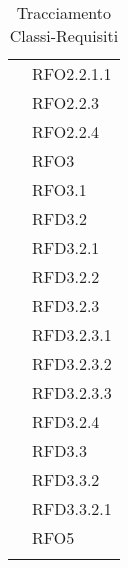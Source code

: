 \begin{longtable}{|>{\centering}m{10cm}|m{3cm}<{\centering}|}
& RFO2.2.1.1\\
& RFO2.2.3\\
& RFO2.2.4\\
& RFO3\\
& RFO3.1\\
& RFD3.2\\
& RFD3.2.1\\
& RFD3.2.2\\
& RFD3.2.3\\
& RFD3.2.3.1\\
& RFD3.2.3.2\\
& RFD3.2.3.3\\
& RFD3.2.4\\
& RFD3.3\\
& RFD3.3.2\\
& RFD3.3.2.1\\
& RFO5\\ \hline

\caption[Tracciamento Classi-Requisiti]{Tracciamento Classi-Requisiti}
\label{tabella:class-requi}
\end{longtable}
\clearpage

